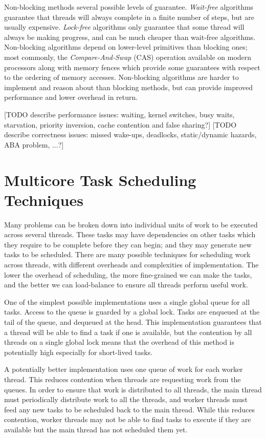 Non-blocking methods several possible levels of guarantee. \emph{Wait-free} algorithms guarantee that threads will always complete in a finite number of steps, but are usually expensive. \emph{Lock-free} algorithms only guarantee that some thread will always be making progress, and can be much cheaper than wait-free algorithms. Non-blocking algorithms depend on lower-level primitives than blocking ones; most commonly, the \emph{Compare-And-Swap} (CAS) operation available on modern processors along with memory fences which provide some guarantees with respect to the ordering of memory accesses. Non-blocking algorithms are harder to implement and reason about than blocking methods, but can provide improved performance and lower overhead in return.

[TODO describe performance issues: waiting, kernel switches, busy waits, starvation, priority inversion, cache contention and false sharing?]
[TODO describe correctness issues: missed wake-ups, deadlocks, static/dynamic hazards, ABA problem, ...?]

\section{Multicore Task Scheduling Techniques}

Many problems can be broken down into individual units of work to be executed across several threads. These tasks may have dependencies on other tasks which they require to be complete before they can begin; and they may generate new tasks to be scheduled. There are many possible techniques for scheduling work across threads, with different overheads and complexities of implementation. The lower the overhead of scheduling, the more fine-grained we can make the tasks, and the better we can load-balance to ensure all threads perform useful work.

One of the simplest possible implementations uses a single global queue for all tasks. Access to the queue is guarded by a global lock. Tasks are enqueued at the tail of the queue, and dequeued at the head. This implementation guarantees that a thread will be able to find a task if one is available, but the contention by all threads on a single global lock means that the overhead of this method is potentially high especially for short-lived tasks.

A potentially better implementation uses one queue of work for each worker thread. This reduces contention when threads are requesting work from the queues. In order to ensure that work is distributed to all threads, the main thread must periodically distribute work to all the threads, and worker threads must feed any new tasks to be scheduled back to the main thread. While this reduces contention, worker threads may not be able to find tasks to execute if they are available but the main thread has not scheduled them yet.

